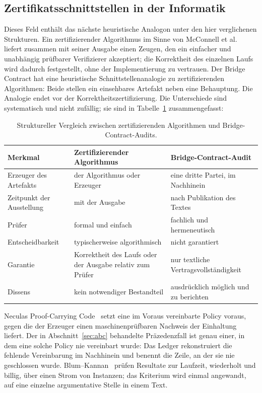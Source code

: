 \documentclass[11pt,a4paper]{article}
\begin{document}
\subsection{Zertifikatsschnittstellen in der Informatik}\label{sec:related-certificates}

Dieses Feld enthält das nächste heuristische Analogon unter den hier
verglichenen Strukturen.
Ein zertifizierender Algorithmus im Sinne von McConnell et
al.~\cite{McConnell2011} liefert zusammen mit seiner Ausgabe einen Zeugen,
den ein einfacher und unabhängig prüfbarer Verifizierer akzeptiert; die
Korrektheit des einzelnen Laufs wird dadurch festgestellt, ohne der
Implementierung zu vertrauen. Der Bridge Contract hat eine heuristische
Schnittstellenanalogie zu zertifizierenden Algorithmen: Beide stellen ein
einsehbares Artefakt neben eine Behauptung. Die Analogie endet vor der
Korrektheitszertifizierung. Die Unterschiede sind systematisch und nicht
zufällig; sie sind in Tabelle~\ref{tab:certifying_vs_bcm} zusammengefasst:

\begin{table}[htbp]
\centering
\small
\caption{Struktureller Vergleich zwischen zertifizierenden Algorithmen und Bridge-Contract-Audits.}
\label{tab:certifying_vs_bcm}
\begin{tabularx}{\textwidth}{@{}l >{\raggedright\arraybackslash}X >{\raggedright\arraybackslash}X@{}}
\toprule
Merkmal & Zertifizierender Algorithmus & Bridge-Contract-Audit \\
\midrule
Erzeuger des Artefakts & der Algorithmus oder Erzeuger & eine dritte Partei,
  im Nachhinein \\
Zeitpunkt der Ausstellung & mit der Ausgabe & nach Publikation des Textes \\
Prüfer & formal und einfach & fachlich und hermeneutisch \\
Entscheidbarkeit & typischerweise algorithmisch & nicht garantiert \\
Garantie & Korrektheit des Laufs oder der Ausgabe relativ zum Prüfer
  & nur textliche Vertragsvollständigkeit \\
Dissens & kein notwendiger Bestandteil & ausdrücklich möglich und zu
  berichten \\
\bottomrule
\end{tabularx}
\end{table}

\noindent
Neculas Proof-Carrying Code~\cite{Necula1997} setzt eine im Voraus
vereinbarte Policy voraus, gegen die der Erzeuger einen maschinenprüfbaren
Nachweis der Einhaltung liefert. Der in Abschnitt~\ref{sec:abc} behandelte
Präzedenzfall ist genau einer, in dem eine solche Policy nie vereinbart
wurde: Das Ledger rekonstruiert die fehlende Vereinbarung im Nachhinein und
benennt die Zeile, an der sie nie geschlossen wurde.
Blum--Kannan~\cite{Blum1995} prüfen Resultate zur Laufzeit, wiederholt und
billig, über einen Strom von Instanzen; das Kriterium wird einmal angewandt,
auf eine einzelne argumentative Stelle in einem Text.
\end{document}
